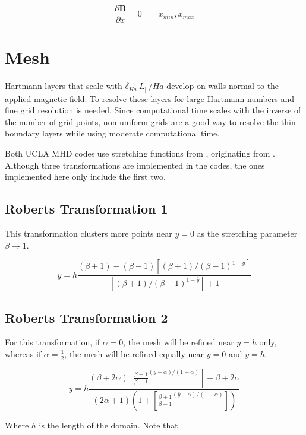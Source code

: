 \documentclass[11pt]{article}
\begin{document}
\begin{equation}
	\frac{\partial \pmb{B}}{\partial x} = 0
	\qquad
	x_{min},x_{max}
\end{equation}

\section{Mesh}
Hartmann layers that scale with $\delta_{Ha}~L_{||}/Ha$ develop on walls normal to the applied magnetic field. To resolve these layers for large Hartmann numbers and fine grid resolution is needed. Since computational time scales with the inverse of the number of grid points, non-uniform grids are a good way to resolve the thin boundary layers while using moderate computational time.

Both UCLA MHD codes use stretching functions from \cite{pletcher2012computational}, originating from \cite{Roberts1971}. Although three transformations are implemented in the codes, the ones implemented here only include the first two.

\subsection{Roberts Transformation 1}

This transformation clusters more points near $y=0$ as the stretching parameter $\beta \rightarrow 1$.

\begin{equation}
	y
	=
	h
	\frac{(\beta+1)-(\beta-1) \left[ (\beta+1)/(\beta-1)^{1-\bar{y}} \right] }
	{\left[ (\beta+1)/(\beta-1)^{1-\bar{y}} \right]+1}
\end{equation}

\subsection{Roberts Transformation 2}
For this transformation, if $\alpha=0$, the mesh will be refined near $y=h$ only, whereas if $\alpha= \frac{1}{2}$, the mesh will be refined equally near $y=0$ and $y=h$.

\begin{equation}
	y
	=
	h
	\frac{
	(\beta + 2 \alpha)
	\left[ \frac{\beta+1}{\beta-1}^{(\bar{y}-\alpha)/(1-\alpha)} \right] - \beta + 2 \alpha}
	{
	(2\alpha+1)
	\left(1+\left[ \frac{\beta+1}{\beta-1}^{(\bar{y}-\alpha)/(1-\alpha)} \right]
	\right)
	}
\end{equation}

Where $h$ is the length of the domain. Note that
\end{document}
